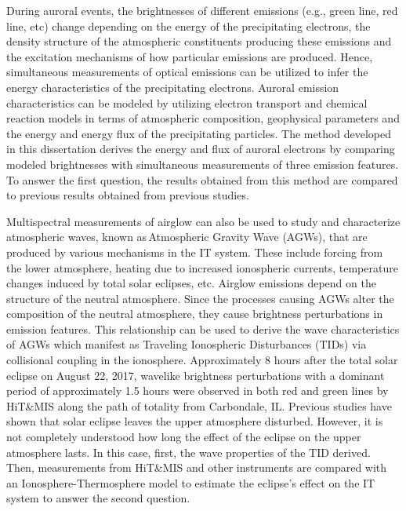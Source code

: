  

During auroral events, the brightnesses of different emissions (e.g., green line, red line, etc) change depending on the energy of the precipitating electrons, the density structure of the atmospheric constituents producing these emissions and the excitation mechanisms of how particular emissions are produced. Hence, simultaneous measurements of optical emissions can be utilized to infer the energy characteristics of the precipitating electrons. Auroral emission characteristics can be modeled by utilizing electron transport and chemical reaction models in terms of atmospheric composition, geophysical parameters and the energy and energy flux of the precipitating particles. The method developed in this dissertation derives the energy and flux of auroral electrons by comparing modeled brightnesses with simultaneous measurements of three emission features. To answer the first question, the results obtained from this method are compared to previous results obtained from previous studies.   

 

Multispectral measurements of airglow can also be used to study and characterize atmospheric waves, known as Atmospheric Gravity Wave (AGWs), that are produced by various mechanisms in the IT system. These include forcing from the lower atmosphere, heating due to increased ionospheric currents, temperature changes induced by total solar eclipses, etc. Airglow emissions depend on the structure of the neutral atmosphere. Since the processes causing AGWs alter the composition of the neutral atmosphere, they cause brightness perturbations in emission features. This relationship can be used to derive the wave characteristics of AGWs which manifest as Traveling Ionospheric Disturbances (TIDs) via collisional coupling in the ionosphere. Approximately 8 hours after the total solar eclipse on August 22, 2017, wavelike brightness perturbations with a dominant period of approximately 1.5 hours were observed in both red and green lines by HiT\&MIS along the path of totality from Carbondale, IL. Previous studies have shown that solar eclipse leaves the upper atmosphere disturbed. However, it is not completely understood how long the effect of the eclipse on the upper atmosphere lasts. In this case, first, the wave properties of the TID derived. Then, measurements from HiT\&MIS and other instruments are compared with an Ionosphere-Thermosphere model to estimate the eclipse's effect on the IT system to answer the second question.
